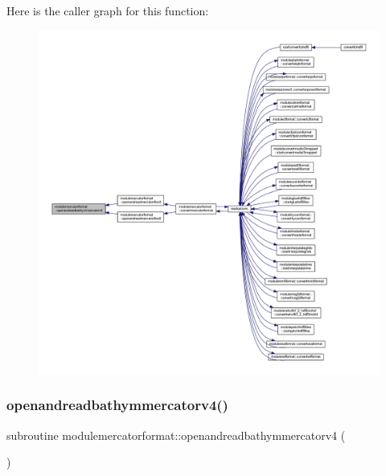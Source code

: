 Here is the caller graph for this function\+:\nopagebreak
\begin{figure}[H]
\begin{center}
\leavevmode
\includegraphics[width=350pt]{namespacemodulemercatorformat_a97c77676ac9667492c50594f60e6c907_icgraph}
\end{center}
\end{figure}
\mbox{\label{namespacemodulemercatorformat_a8fac17a041e16d3f9659e7665adf2656}} 
\subsubsection{\texorpdfstring{openandreadbathymmercatorv4()}{openandreadbathymmercatorv4()}}
{\footnotesize\ttfamily subroutine modulemercatorformat\+::openandreadbathymmercatorv4 (\begin{DoxyParamCaption}{ }\end{DoxyParamCaption})\hspace{0.3cm}{\ttfamily [private]}}

